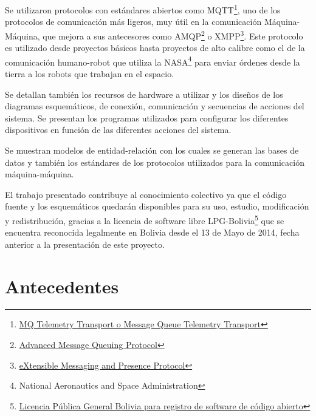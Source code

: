 \documentclass[../principal.tex]{subfiles}
\begin{document}
  Se utilizaron protocolos con estándares abiertos como MQTT\footnote{\href{https://en.wikipedia.org/wiki/MQTT}{MQ Telemetry Transport o Message Queue Telemetry Transport}}, uno de los protocolos de comunicación más ligeros, muy útil en la comunicación Máquina-Máquina, que mejora a sus antecesores como AMQP\footnote{\href{https://es.wikipedia.org/wiki/Advanced_Message_Queuing_Protocol}{Advanced Message Queuing Protocol}} o XMPP\footnote{\href{https://en.wikipedia.org/wiki/XMPP}{eXtensible Messaging and Presence Protocol}}. Este protocolo es utilizado desde proyectos básicos hasta proyectos de alto calibre como el de la comunicación humano-robot que utiliza la NASA\footnote{National Aeronautics and Space Administration} para enviar órdenes desde la tierra a los robots que trabajan en el espacio.\cite{web:iot_dependencia_protocolos}

  Se detallan también los recursos de hardware a utilizar y los diseños de los diagramas esquemáticos, de conexión, comunicación y secuencias de acciones del sistema. Se presentan los programas utilizados para configurar los diferentes dispositivos en función de las diferentes acciones del sistema.

  Se muestran modelos de entidad-relación con los cuales se generan las bases de datos y también los estándares de los protocolos utilizados para la comunicación máquina-máquina.

  El trabajo presentado contribuye al conocimiento colectivo ya que el código fuente y los esquemáticos quedarán disponibles para su uso, estudio, modificación y redistribución, gracias a la licencia de software libre LPG-Bolivia\footnote{\href{https://softwarelibre.gob.bo/documentos/LPGBolivia.pdf}{Licencia Pública General Bolivia para registro de software de código abierto}} que se encuentra reconocida legalmente en Bolivia desde el 13 de Mayo de 2014, fecha anterior a la presentación de este proyecto.

  \section{Antecedentes}
\end{document}
